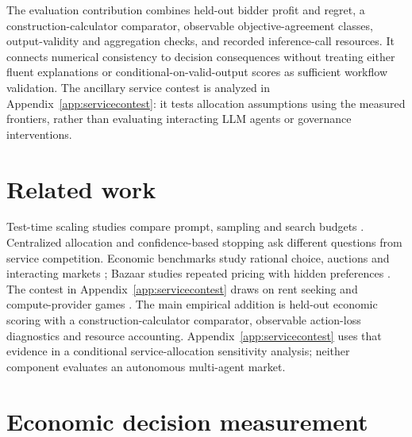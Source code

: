 \documentclass[sigconf,anonymous,nonacm]{acmart}
\begin{document}
The evaluation contribution combines held-out bidder profit and regret, a construction-calculator comparator, observable objective-agreement classes, output-validity and aggregation checks, and recorded inference-call resources. It connects numerical consistency to decision consequences without treating either fluent explanations or conditional-on-valid-output scores as sufficient workflow validation. The ancillary service contest is analyzed in Appendix~\ref{app:servicecontest}: it tests allocation assumptions using the measured frontiers, rather than evaluating interacting LLM agents or governance interventions.
\section{Related work}
Test-time scaling studies compare prompt, sampling and search budgets \citep{wei2022chain,snell2024scaling,wu2024inference,alomrani2025budget}. Centralized allocation \citep{wan2026shadowprice} and confidence-based stopping \citep{jurayj2025finalanswer} ask different questions from service competition. Economic benchmarks study rational choice, auctions and interacting markets \citep{fish2025econevals,chen2024aucarena,zhu2024synthetic}; Bazaar studies repeated pricing with hidden preferences \citep{ahmed2026bazaar}. The contest in Appendix~\ref{app:servicecontest} draws on rent seeking \citep{tullock1980efficient} and compute-provider games \citep{artola2026games}.
The main empirical addition is held-out economic scoring with a construction-calculator comparator, observable action-loss diagnostics and resource accounting. Appendix~\ref{app:servicecontest} uses that evidence in a conditional service-allocation sensitivity analysis; neither component evaluates an autonomous multi-agent market.
\section{Economic decision measurement}
\label{sec:framework}
\end{document}
